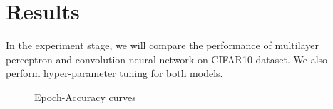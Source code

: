 \documentclass[11pt]{scrartcl}
\begin{document}
\section{Results}
In the experiment stage, we will compare the performance of multilayer perceptron and convolution neural network on CIFAR10 dataset\cite{krizhevsky2009learning}. We also perform hyper-parameter tuning for both models.

\begin{figure}[htbp]
	\centering
	\centering
	\caption{Epoch-Accuracy curves}
\end{figure}
\end{document}
